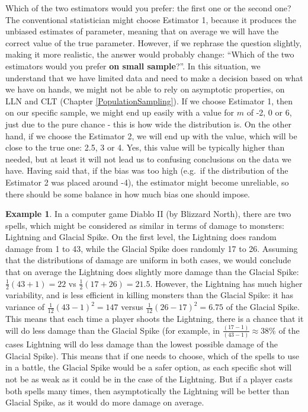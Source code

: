 \documentclass[
]{book}
\theoremstyle{definition}
\theoremstyle{definition}
\newtheorem{example}{Example}[chapter]
\theoremstyle{definition}
\theoremstyle{definition}
\theoremstyle{remark}
\begin{document}
Which of the two estimators would you prefer: the first one or the second one? The conventional statistician might choose Estimator 1, because it produces the unbiased estimates of parameter, meaning that on average we will have the correct value of the true parameter. However, if we rephrase the question slightly, making it more realistic, the answer would probably change: ``Which of the two estimators would you prefer \textbf{on small sample}?''. In this situation, we understand that we have limited data and need to make a decision based on what we have on hands, we might not be able to rely on asymptotic properties, on LLN and CLT (Chapter \ref{PopulationSampling}). If we choose Estimator 1, then on our specific sample, we might end up easily with a value for \(m\) of -2, 0 or 6, just due to the pure chance - this is how wide the distribution is. On the other hand, if we choose the Estimator 2, we will end up with the value, which will be close to the true one: 2.5, 3 or 4. Yes, this value will be typically higher than needed, but at least it will not lead us to confusing conclusions on the data we have. Having said that, if the bias was too high (e.g.~if the distribution of the Estimator 2 was placed around -4), the estimator might become unreliable, so there should be some balance in how much bias one should impose.

\begin{example}
In a computer game Diablo II (by Blizzard North), there are two spells, which might be considered as similar in terms of damage to monsters: Lightning and Glacial Spike. On the first level, the Lightning does random damage from 1 to 43, while the Glacial Spike does randomly 17 to 26. Assuming that the distributions of damage are uniform in both cases, we would conclude that on average the Lightning does slightly more damage than the Glacial Spike: \(\frac{1}{2}(43+1)=22\) vs \(\frac{1}{2}(17+26)=21.5\). However, the Lightning has much higher variability, and is less efficient in killing monsters than the Glacial Spike: it has variance of \(\frac{1}{12}(43-1)^2 = 147\) versus \(\frac{1}{12}(26-17)^2 = 6.75\) of the Glacial Spike. This means that each time a player shoots the Lightning, there is a chance that it will do less damage than the Glacial Spike (for example, in \(\frac{(17-1)}{(43-1)} \approx 38\)\% of the cases Lightning will do less damage than the lowest possible damage of the Glacial Spike). This means that if one needs to choose, which of the spells to use in a battle, the Glacial Spike would be a safer option, as each specific shot will not be as weak as it could be in the case of the Lightning. But if a player casts both spells many times, then asymptotically the Lightning will be better than Glacial Spike, as it would do more damage on average.
\end{example}
\end{document}
